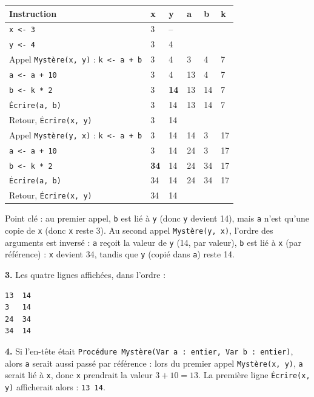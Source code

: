 \documentclass[11pt]{article}
\begin{document}
\begin{corrige}
\begin{center}
\begin{tabularx}{\linewidth}{|X|l|l|l|l|l|}
\hline
\rowcolor{popblueL} \textbf{Instruction} & \textbf{x} & \textbf{y} & \textbf{a} & \textbf{b} & \textbf{k} \\
\hline
\texttt{x <- 3} & 3 & -- & & & \\
\hline
\texttt{y <- 4} & 3 & 4 & & & \\
\hline
Appel \texttt{Mystère(x, y)} : \texttt{k <- a + b} & 3 & 4 & 3 & 4 & 7 \\
\hline
\texttt{a <- a + 10} & 3 & 4 & 13 & 4 & 7 \\
\hline
\texttt{b <- k * 2} & 3 & \textbf{14} & 13 & 14 & 7 \\
\hline
\texttt{Écrire(a, b)} & 3 & 14 & 13 & 14 & 7 \\
\hline
Retour, \texttt{Écrire(x, y)} & 3 & 14 & & & \\
\hline
Appel \texttt{Mystère(y, x)} : \texttt{k <- a + b} & 3 & 14 & 14 & 3 & 17 \\
\hline
\texttt{a <- a + 10} & 3 & 14 & 24 & 3 & 17 \\
\hline
\texttt{b <- k * 2} & \textbf{34} & 14 & 24 & 34 & 17 \\
\hline
\texttt{Écrire(a, b)} & 34 & 14 & 24 & 34 & 17 \\
\hline
Retour, \texttt{Écrire(x, y)} & 34 & 14 & & & \\
\hline
\end{tabularx}
\end{center}

Point clé : au premier appel, \texttt{b} est lié à \texttt{y} (donc \texttt{y} devient 14), mais \texttt{a} n'est qu'une copie de \texttt{x} (donc \texttt{x} reste 3). Au second appel \texttt{Mystère(y, x)}, l'ordre des arguments est inversé : \texttt{a} reçoit la valeur de \texttt{y} (14, par valeur), \texttt{b} est lié à \texttt{x} (par référence) : \texttt{x} devient 34, tandis que \texttt{y} (copié dans \texttt{a}) reste 14.

\textbf{3.} Les quatre lignes affichées, dans l'ordre :
\begin{lstlisting}
13  14
3   14
24  34
34  14
\end{lstlisting}

\textbf{4.} Si l'en-tête était \texttt{Procédure Mystère(Var a : entier, Var b : entier)}, alors \texttt{a} serait aussi passé par référence : lors du premier appel \texttt{Mystère(x, y)}, \texttt{a} serait lié à \texttt{x}, donc \texttt{x} prendrait la valeur $3 + 10 = 13$. La première ligne \texttt{Écrire(x, y)} afficherait alors : \texttt{13  14}.


\end{corrige}
\end{document}
